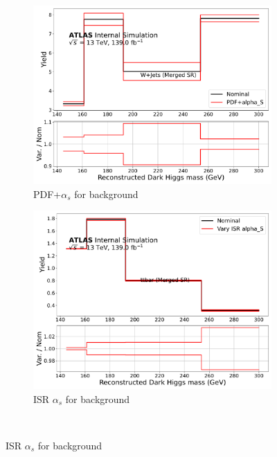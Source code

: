 \begin{figure}[!tb]
  \centering
    \begin{subfigure}{0.45\textwidth}
    \includegraphics[width=\textwidth]{Figures/6/pdf_plus_alphas_syst_W+Jets_SR_mgd_TARJets10_minmS_mgd_yield.pdf}
    \caption{PDF+\(\alpha_s\) for \wjets background}
    \label{fig:wjets_pdf}
  \end{subfigure} \hspace{1em}
  \begin{subfigure}{0.45\textwidth}
    \includegraphics[width=\textwidth]{Figures/6/ISR_alphas_syst_ttbar_SR_mgd_TARJets10_minmS_mgd_yield.pdf}
    \caption{ISR \(\alpha_s\) for \ttbar background}
    \label{fig:ttbar_ISR_alphas}
    \end{subfigure} \\ \vspace{1em}
    

\end{figure}

